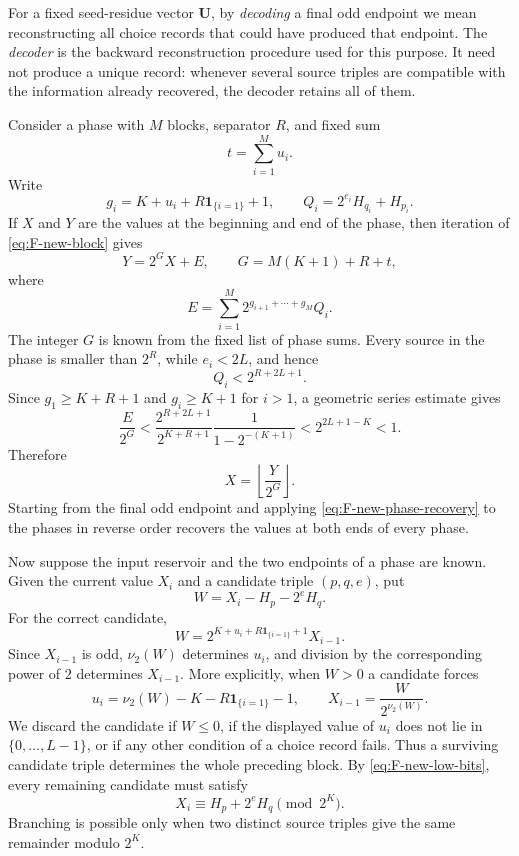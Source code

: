 \documentclass{article}
\theoremstyle{definition}
\begin{document}
For a fixed seed-residue vector $\mathbf U$, by \emph{decoding} a final odd
endpoint we mean reconstructing all choice records that could have produced
that endpoint.  The \emph{decoder} is the backward reconstruction procedure
used for this purpose.  It need not produce a unique record: whenever several
source triples are compatible with the information already recovered, the
decoder retains all of them.

Consider a phase with $M$ blocks, separator $R$, and fixed sum
$$
 t=\sum_{i=1}^M u_i.
$$
Write
$$
 g_i=K+u_i+R\mathbf 1_{\{i=1\}}+1,
 \qquad
 Q_i=2^{e_i}H_{q_i}+H_{p_i}.
$$
If $X$ and $Y$ are the values at the beginning and end of the phase, then
iteration of \eqref{eq:F-new-block} gives
$$
 Y=2^GX+E,
 \qquad
 G=M(K+1)+R+t,
$$
where
$$
 E=\sum_{i=1}^M2^{g_{i+1}+\cdots+g_M}Q_i.
$$
The integer $G$ is known from the fixed list of phase sums.  Every source in
the phase is smaller than $2^R$, while $e_i<2L$, and hence
$$
 Q_i<2^{R+2L+1}.
$$
Since $g_1\geq K+R+1$ and $g_i\geq K+1$ for $i>1$, a geometric series
estimate gives
$$
 \frac E{2^G}
 <
 \frac{2^{R+2L+1}}{2^{K+R+1}}
 \frac1{1-2^{-(K+1)}}
 <2^{2L+1-K}<1.
$$
Therefore
\begin{equation}
 X=\left\lfloor\frac Y{2^G}\right\rfloor.
 \label{eq:F-new-phase-recovery}
\end{equation}
Starting from the final odd endpoint and applying
\eqref{eq:F-new-phase-recovery} to the phases in reverse order recovers the
values at both ends of every phase.

Now suppose the input reservoir and the two endpoints of a phase are known.
Given the current value $X_i$ and a candidate triple $(p,q,e)$, put
\begin{equation}
 W=X_i-H_p-2^eH_q.
 \label{eq:F-new-reverse-block}
\end{equation}
For the correct candidate,
$$
 W=2^{K+u_i+R\mathbf 1_{\{i=1\}}+1}X_{i-1}.
$$
Since $X_{i-1}$ is odd, $\nu_2(W)$ determines $u_i$, and division by the
corresponding power of $2$ determines $X_{i-1}$.  More explicitly, when
$W>0$ a candidate forces
$$
 u_i=\nu_2(W)-K-R\mathbf 1_{\{i=1\}}-1,
 \qquad
 X_{i-1}=\frac{W}{2^{\nu_2(W)}}.
$$
We discard the candidate if $W\leq0$, if the displayed value of $u_i$ does
not lie in $\{0,\ldots,L-1\}$, or if any other condition of a choice record
fails.  Thus a surviving candidate triple determines the whole preceding
block.  By \eqref{eq:F-new-low-bits}, every remaining candidate must satisfy
$$
 X_i\equiv H_p+2^eH_q\pmod {2^K}.
$$
Branching is possible only when two distinct source triples give the same
remainder modulo $2^K$.
\end{document}
